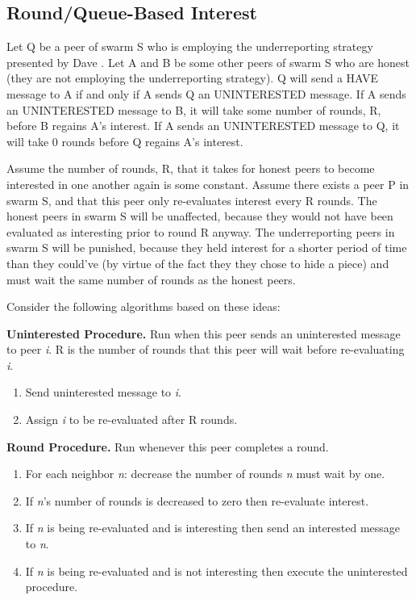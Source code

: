 \subsection {Round/Queue-Based Interest}


Let Q be a peer of swarm S who is employing the underreporting strategy presented by Dave \cite {dlbittorrent}. Let A and B be some other peers of swarm S who are honest (they are not employing the underreporting strategy). Q will send a HAVE message to A if and only if A sends Q an UNINTERESTED message. If A sends an UNINTERESTED message to B, it will take some number of rounds, R, before B regains A's interest. If A sends an UNINTERESTED message to Q, it will take 0 rounds before Q regains A's interest.

Assume the number of rounds, R, that it takes for honest peers to become interested in one another again is some constant. Assume there exists a peer P in swarm S, and that this peer only re-evaluates interest every R rounds. The honest peers in swarm S will be unaffected, because they would not have been evaluated as interesting prior to round R anyway. The underreporting peers in swarm S will be punished, because they held interest for a shorter period of time than they could've (by virtue of the fact they they chose to hide a piece) and must wait the same number of rounds as the honest peers.

Consider the following algorithms based on these ideas:\newline

\textbf {Uninterested Procedure.} Run when this peer sends an uninterested message to peer \textit{i}. R is the number of rounds that this peer will wait before re-evaluating \textit{i}.

\begin {enumerate}
    \item Send uninterested message to \textit{i}.
    \item Assign \textit{i} to be re-evaluated after R rounds.
\end {enumerate}

\textbf {Round Procedure.} Run whenever this peer completes a round.

\begin {enumerate}
    \item For each neighbor \textit{n}: decrease the number of rounds \textit{n} must wait by one.
    \item If \textit{n}'s number of rounds is decreased to zero then re-evaluate interest.
    \item If \textit{n} is being re-evaluated and is interesting then send an interested message to \textit{n}.
    \item If \textit{n} is being re-evaluated and is not interesting then execute the uninterested procedure.
\end {enumerate}

